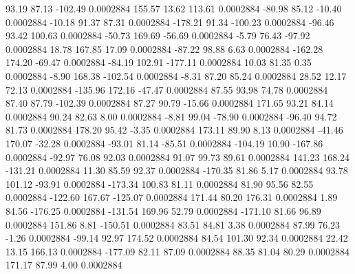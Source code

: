        93.19       87.13     -102.49     0.0002884
      155.57       13.62      113.61     0.0002884
      -80.98       85.12      -10.40     0.0002884
      -10.18       91.37       87.31     0.0002884
     -178.21       91.34     -100.23     0.0002884
      -96.46       93.42      100.63     0.0002884
      -50.73      169.69      -56.69     0.0002884
       -5.79       76.43      -97.92     0.0002884
       18.78      167.85       17.09     0.0002884
      -87.22       98.88        6.63     0.0002884
     -162.28      174.20      -69.47     0.0002884
      -84.19      102.91     -177.11     0.0002884
       10.03       81.35        0.35     0.0002884
       -8.90      168.38     -102.54     0.0002884
       -8.31       87.20       85.24     0.0002884
       28.52       12.17       72.13     0.0002884
     -135.96      172.16      -47.47     0.0002884
       87.55       93.98       74.78     0.0002884
       87.40       87.79     -102.39     0.0002884
       87.27       90.79      -15.66     0.0002884
      171.65       93.21       84.14     0.0002884
       90.24       82.63        8.00     0.0002884
       -8.81       99.04      -78.90     0.0002884
      -96.40       94.72       81.73     0.0002884
      178.20       95.42       -3.35     0.0002884
      173.11       89.90        8.13     0.0002884
      -41.46      170.07      -32.28     0.0002884
      -93.01       81.14      -85.51     0.0002884
     -104.19       10.90     -167.86     0.0002884
      -92.97       76.08       92.03     0.0002884
       91.07       99.73       89.61     0.0002884
      141.23      168.24     -131.21     0.0002884
       11.30       85.59       92.37     0.0002884
     -170.35       81.86        5.17     0.0002884
       93.78      101.12      -93.91     0.0002884
     -173.34      100.83       81.11     0.0002884
       81.90       95.56       82.55     0.0002884
     -122.60      167.67     -125.07     0.0002884
      171.44       80.20      176.31     0.0002884
        1.89       84.56     -176.25     0.0002884
     -131.54      169.96       52.79     0.0002884
     -171.10       81.66       96.89     0.0002884
      151.86        8.81     -150.51     0.0002884
       83.51       84.81        3.38     0.0002884
       87.99       76.23       -1.26     0.0002884
      -99.14       92.97      174.52     0.0002884
       84.54      101.30       92.34     0.0002884
       22.42       13.15      166.13     0.0002884
     -177.09       82.11       87.09     0.0002884
       88.35       81.04       80.29     0.0002884
      171.17       87.99        4.00     0.0002884
